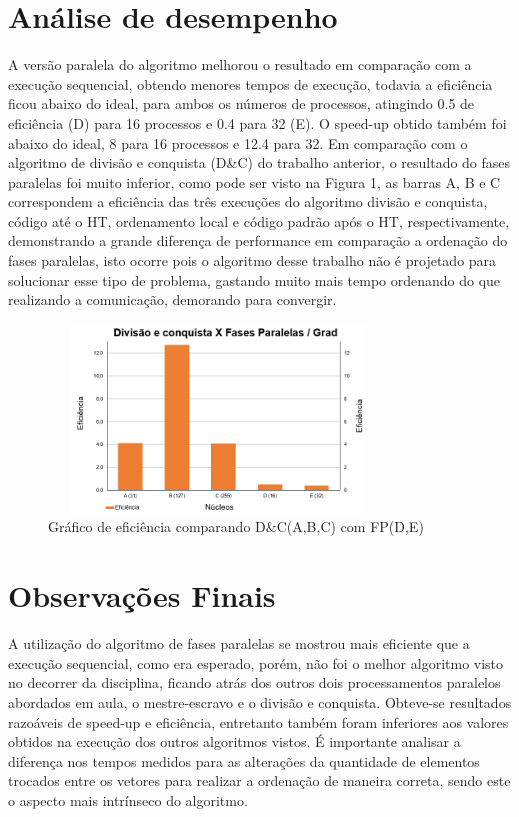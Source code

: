 \documentclass{article}
\begin{document}
\begin{multicols*}{2}
\section{Análise de desempenho}
A versão paralela do algoritmo melhorou o resultado em comparação com a execução sequencial, obtendo menores tempos de execução, todavia a eficiência ficou abaixo do ideal, para ambos os números de processos, atingindo 0.5 de eficiência (D) para 16 processos e 0.4 para 32 (E). O speed-up obtido também foi abaixo do ideal, 8 para 16 processos e 12.4 para 32. Em comparação com o algoritmo de divisão e conquista (D\&C) do trabalho anterior, o resultado do fases paralelas foi muito inferior, como pode ser visto na Figura 1, as barras A, B e C correspondem a eficiência das três execuções do algoritmo divisão e conquista, código até o HT, ordenamento local e código padrão após o HT, respectivamente, demonstrando a grande diferença de performance em comparação a ordenação do fases paralelas, isto ocorre pois o algoritmo desse trabalho não é projetado para solucionar esse tipo de problema, gastando muito mais tempo ordenando do que realizando a comunicação, demorando para convergir.  
\begin{figure}[H]
            \centering
            \vspace{-1.1em}
            \includegraphics[width=9cm, height=5cm]{Capture.PNG}
            \vspace{-1.9em}
            \caption{Gráfico de eficiência comparando D\&C(A,B,C) com FP(D,E)}
            \vspace{-1.2em}
\end{figure}
\section{Observações Finais}
A utilização do algoritmo de fases paralelas se mostrou mais eficiente que a execução sequencial, como era esperado, porém, não foi o melhor algoritmo visto no decorrer da disciplina, ficando atrás dos outros dois processamentos paralelos abordados em aula, o mestre-escravo e o divisão e conquista. Obteve-se resultados razoáveis de speed-up e eficiência, entretanto também foram inferiores aos valores obtidos na execução dos outros algoritmos vistos. É importante analisar a diferença nos tempos medidos para as alterações da quantidade de elementos trocados entre os vetores para realizar a ordenação de maneira correta, sendo este o aspecto mais intrínseco do algoritmo.

\end{multicols*}

\newpage


\end{document}
